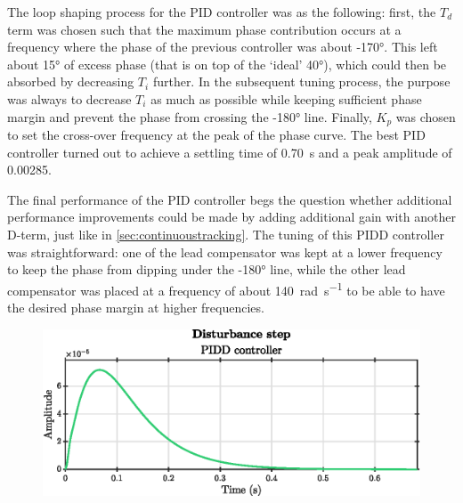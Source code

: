 The loop shaping process for the PID controller was as the following: first, the $T_d$ term was chosen such that the maximum phase contribution occurs at a frequency where the phase of the previous controller was about \ang{-170}. This left about \ang{15} of excess phase (that is on top of the `ideal' \ang{40}), which could then be absorbed by decreasing $T_i$ further. In the subsequent tuning process, the purpose was always to decrease $T_i$ as much as possible while keeping sufficient phase margin and prevent the phase from crossing the \ang{-180} line. Finally, $K_p$ was chosen to set the cross-over frequency at the peak of the phase curve. The best PID controller turned out to achieve a settling time of \SI{0.70}{\second} and a peak amplitude of \num{0.00285}.

The final performance of the PID controller begs the question whether additional performance improvements could be made by adding additional gain with another D-term, just like in \cref{sec:continuoustracking}. The tuning of this PIDD controller was straightforward: one of the lead compensator was kept at a lower frequency to keep the phase from dipping under the \ang{-180} line, while the other lead compensator was placed at a frequency of about \SI{140}{\radian\per\second} to be able to have the desired phase margin at higher frequencies. 
\begin{figure}[ht!]
    \centering
    \includegraphics[]{media/q2/pidd_response.eps}
    \caption{}
    \label{fig:q2_pidd_response}
\end{figure}

